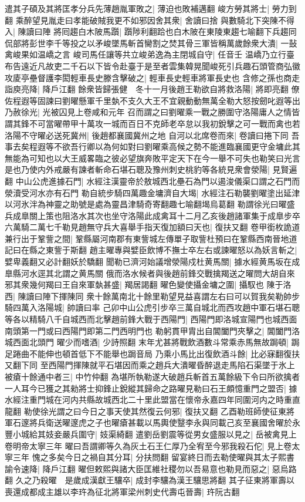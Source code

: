 遣其子碩及其將匡孝分兵先薄趙胤軍敗之|{
	薄迫也敗補邁翻}
峻方勞其將士|{
	勞力到翻}
乘醉望見胤走曰孝能破賊我更不如邪因舍其衆|{
	舍讀曰捨}
與數騎北下突陳不得入|{
	陳讀曰陣}
將囘趨白木陂馬躓|{
	躓陟利翻跲也白木陂在東陵東趨七喻翻下兵趨同}
侃部將彭世李千等投之以矛峻墜馬斬首臠割之焚其骨三軍皆稱萬歲餘衆大潰|{
	一鼔禽峻果如温嶠之言}
峻司馬任讓等共立峻弟逸為主閉城自守|{
	任音壬}
温嶠乃立行臺布告遠近凡故吏二千石以下皆令赴臺于是至者雲集韓晃聞峻死引兵趣石頭管商弘徽攻庱亭壘督護李閎輕車長史滕含擊破之|{
	輕車長史輕車將軍長史也}
含修之孫也商走詣庾亮降|{
	降戶江翻}
餘衆皆歸張健　冬十一月後趙王勒欲自將救洛陽|{
	將即亮翻}
僚佐程遐等固諫曰劉曜懸軍千里埶不支久大王不宜親動動無萬全勒大怒按劒叱遐等出乃赦徐光|{
	光被囚見上卷咸和元年}
召而謂之曰劉曜乘一戰之勝圍守洛陽庸人之情皆謂其鋒不可當曜帶甲十萬攻一城而百日不克師老卒怠以我初銳擊之可一戰而禽也若洛陽不守曜必送死冀州|{
	後趙都襄國冀州之地}
自河以北席卷而來|{
	卷讀曰捲下同}
吾事去矣程遐等不欲吾行卿以為何如對曰劉曜乘高候之勢不能進臨襄國更守金墉此其無能為可知也以大王威畧臨之彼必望旗奔敗平定天下在今一舉不可失也勒笑曰光言是也乃使内外戒嚴有諫者斬命石堪石聰及豫州刺史桃豹等各統見衆會滎陽|{
	見賢遍翻}
中山公虎進據石門|{
	水經注漢靈帝於敖城西北壘石為門以遏浚儀渠口謂之石門而滎瀆受河水亦有石門}
勒自統步騎四萬趣金墉濟自大堨|{
	水經注石勒襲劉曜塗出延津以河氷泮為神靈之助號是處為靈昌津騎奇寄翻趣七喻翻堨烏葛翻}
勒謂徐光曰曜盛兵成臯關上策也阻洛水其次也坐守洛陽此成禽耳十二月乙亥後趙諸軍集于成臯步卒六萬騎二萬七千勒見趙無守兵大喜舉手指天復加額曰天也|{
	復扶又翻}
卷甲銜枚詭道兼行出于鞏訾之間|{
	鞏縣屬河南郡有東訾城左傳單子取訾杜預曰在鞏縣西南晉地道記曰在縣之東訾于斯翻}
趙主曜專與嬖臣飲博不撫士卒左右或諫曜怒以為妖言斬之|{
	嬖卑義翻又必計翻妖於驕翻}
聞勒已濟河始議增滎陽戍杜黄馬關|{
	據水經黄馬坂在成臯縣河水逕其北謂之黄馬關}
俄而洛水候者與後趙前鋒交戰擒羯送之曜問大胡自來邪其衆幾何羯曰王自來軍埶甚盛|{
	羯居謁翻}
曜色變使攝金墉之圍|{
	攝馭也}
陳于洛西|{
	陳讀曰陣下揮陳同}
衆十餘萬南北十餘里勒望見益喜謂左右曰可以賀我矣勒帥步騎四萬入洛陽城|{
	帥讀曰率}
己卯中山公虎引步卒三萬自城北而西攻趙中軍石堪石聰等各以精騎八千自城西而北擊趙前鋒大戰于西陽門|{
	西陽門即洛城宣陽門也城西面南頭第一門或曰西陽門即第二門西明門也}
勒躬貫甲胄出自閶闔門夾擊之|{
	閶闔門洛城西面北頭門}
曜少而嗜酒|{
	少詩照翻}
末年尤甚將戰飲酒數斗常乘赤馬無故跼頓|{
	跼足踡曲不能伸也頓首低下不能舉也跼音局}
乃乘小馬比出復飲酒斗餘|{
	比必寐翻復扶又翻下同}
至西陽門揮陳就平石堪因而乘之趙兵大潰曜昏醉退走馬陷石渠墜于氷上被瘡十餘通中者三|{
	中竹仲翻}
為堪所執勒遂大破趙兵斬首五萬餘級下令曰所欲擒者一人耳今已獲之其勑將士抑鋒止銳縱其歸命之路曜見勒曰石王頗憶重門之盟否|{
	據水經注重門城在河内共縣故城西北二十里此盟當在懷帝永嘉四年同圍河内之時重直龍翻}
勒使徐光謂之曰今日之事天使其然復云何邪|{
	復扶又翻}
乙酉勒班師使征東將軍石邃將兵衛送曜邃虎之子也曜瘡甚載以馬輿使毉李永與同載己亥至襄國舍曜於永豐小城給其妓妾嚴兵圍守|{
	妓渠綺翻}
遣劉岳劉震等從男女盛服以見之|{
	岳被禽見上卷明帝太寧三年}
曜曰吾謂卿等久為灰土石王仁厚乃全宥至今邪我殺石佗|{
	見上卷太寧三年}
愧之多矣今日之禍自其分耳|{
	分扶問翻}
留宴終日而去勒使曜與其太子熙書諭令速降|{
	降戶江翻}
曜但敕熙與諸大臣匡維社稷勿以吾易意也勒見而惡之|{
	惡烏路翻}
久之乃殺曜　是歲成漢獻王驤卒|{
	成封李驤為漢王驤思將翻}
其子征東將軍壽以喪還成都成主雄以李玝為征北將軍梁州刺史代壽屯晉壽|{
	玝阮古翻}


